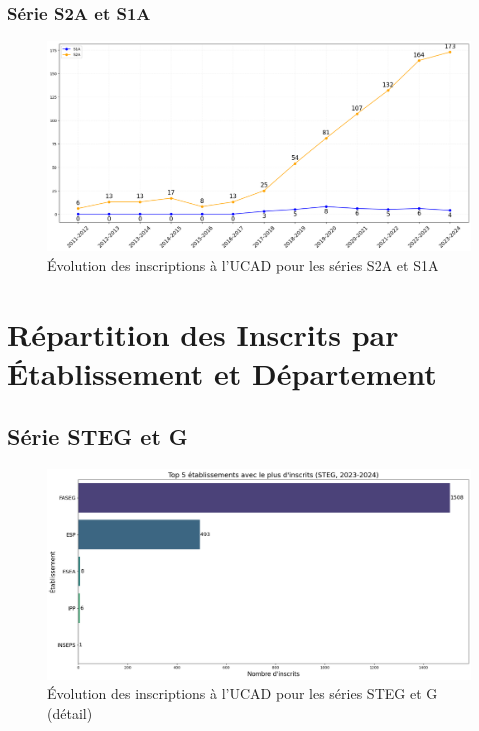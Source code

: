 \newpage
\subsubsection{Série S2A et S1A}

\begin{figure}[h]
\centering
\caption{Évolution des inscriptions à l'UCAD pour les séries S2A et S1A}
\includegraphics[width=1\textwidth]{figure/Inscrits_ucad_SA.png}
\end{figure}

\newpage
\section{Répartition des Inscrits par Établissement et Département}

\subsection{Série STEG et G}

\begin{figure}[h]
\centering
\caption{Évolution des inscriptions à l'UCAD pour les séries STEG et G (détail)}
\includegraphics[width=1\textwidth]{figure/etab_STEG_2024.png}
\end{figure}

